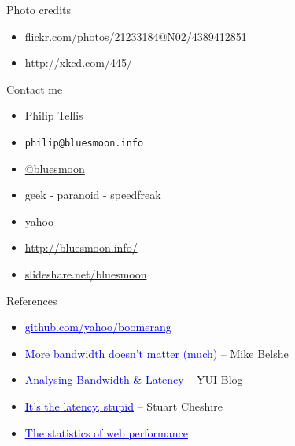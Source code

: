 \documentclass{beamer}
\begin{document}
\begin{frame}{Photo credits}
  \begin{itemize}
  \item \href{http://www.flickr.com/photos/21233184@N02/4389412851/}{flickr.com/photos/21233184@N02/4389412851}
  \item \href{http://xkcd.com/445/}{http://xkcd.com/445/}
  \end{itemize}
\end{frame}

\begin{frame}{Contact me}
  \begin{itemize}
  \item Philip Tellis
  \item \small{\texttt{philip@bluesmoon.info}}
  \item \href{http://twitter.com/bluesmoon}{@bluesmoon}
  \item geek - paranoid - speedfreak
  \item yahoo
  \item \href{http://bluesmoon.info/}{http://bluesmoon.info/}
  \item \href{http://www.slideshare.net/bluesmoon}{slideshare.net/bluesmoon}
  \end{itemize}
\end{frame}

\begin{frame}{References}
  \begin{itemize}
  \item \href{http://github.com/yahoo/boomerang/}{\textcolor{blue}{\underline{github.com/yahoo/boomerang}}}
  \item \href{http://www.belshe.com/2010/05/24/more-bandwidth-doesnt-matter-much/}{\textcolor{blue}{\underline{More bandwidth doesn't matter (much)}} -- Mike Belshe}
  \item \href{http://www.yuiblog.com/blog/2010/04/08/analyzing-bandwidth-and-latency/}{\textcolor{blue}{\underline{Analysing Bandwidth \& Latency}}} -- YUI Blog
  \item \href{http://www.stuartcheshire.org/rants/Latency.html}{\textcolor{blue}{\underline{It's the latency, stupid}}} -- Stuart Cheshire
  \item \href{http://www.slideshare.net/bluesmoon/index-3441823}{\textcolor{blue}{\underline{The statistics of web performance}}}
  \end{itemize}
\end{frame}
\end{document}
